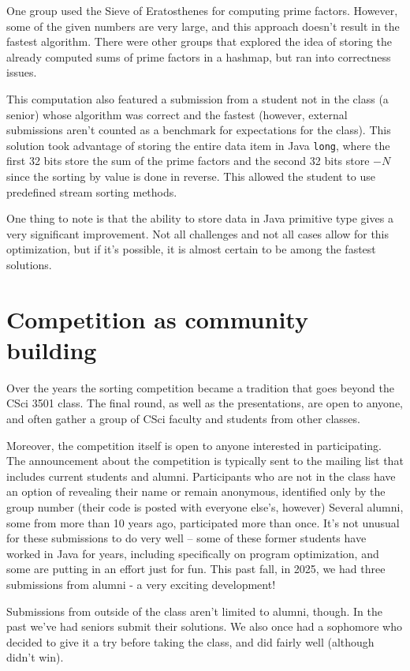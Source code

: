 \documentclass[12pt]{article}
\newcommand{\comment}[1]{}
\newcommand{\emcomment}[1]{\textcolor{ForestGreen}{\comment{Elena: {#1}}}}
\begin{document}
One group used the Sieve of Eratosthenes for computing prime factors. However, some of the given numbers are very large, and this approach doesn't result in the fastest algorithm. There were other groups that explored the idea of storing the already computed sums of prime factors in a hashmap, but ran into correctness issues.

This computation also featured a submission from a student not in the class (a senior) whose algorithm was correct and the fastest (however, external submissions aren't counted as a benchmark for expectations for the class). This solution took advantage of storing the entire data item in Java \texttt{long}, where the first 32 bits store the sum of the prime factors and the second 32 bits store 
$-N$ since the sorting by value is done in reverse. This allowed the student to use predefined stream sorting methods. 

One thing to note is that the ability to store data in Java primitive type gives a very significant improvement. Not all challenges and not all cases allow for this optimization, but if it's possible, it is almost certain to be among the fastest solutions. 

\section{Competition as community building}\label{sec:community}
Over the years the sorting competition became a tradition that goes beyond the CSci 3501 class. The final round, as well as the presentations, are open to anyone, and often gather a group of CSci faculty and students from other classes. 

Moreover, the competition itself is open to anyone interested in participating. 
The announcement about the competition is typically sent to the mailing list that includes current students and alumni. 
Participants who are not in the class have an option of revealing their name or remain anonymous, identified only by the group number (their code is posted with everyone else's, however)
Several alumni, some from more than 10 years ago, participated more than once. 
It's not unusual for these submissions to do very well -- some of these former students have worked in Java for years, including specifically on program optimization, and some are putting in an effort just for fun.
This past fall, in 2025, we had three submissions from alumni - a very exciting development!

Submissions from outside of the class aren't limited to alumni, though. In the past we've had seniors submit their solutions. We also once had a sophomore who decided to give it a try before taking the class, and did fairly well (although didn't win). 
\end{document}
